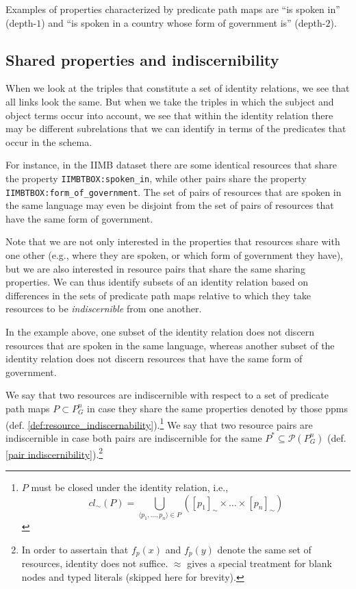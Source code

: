 \documentclass[letterpaper]{article}
\newcommand{\range}[2]{#1, \ldots, #2}
\newcommand{\tuple}[1]{\langle#1\rangle}
\begin{document}
\noindent Examples of properties characterized by predicate path maps are
  ``is spoken in'' (depth-$1$) and
  ``is spoken in a country whose form of government is'' (depth-$2$).

\subsection{Shared properties and indiscernibility}
\label{sec:indiscernibility}

When we look at the triples that constitute a set of identity relations,
  we see that all links look the same.
But when we take the triples in which the subject and object terms occur
  into account, we see that within the identity relation there may be
  different subrelations that we can identify in terms of the predicates
  that occur in the schema.

For instance, in the IIMB dataset there are some identical resources that
  share the property \verb|IIMBTBOX:spoken_in|, while other pairs share
  the property \verb|IIMBTBOX:form_of_government|.
The set of pairs of resources that are spoken in the same language may even
  be disjoint from the set of pairs of resources that have the same
  form of government.

Note that we are not only interested in the properties that resources share
  with one other (e.g., where they are spoken, or which form of government
  they have), but we are also interested in resource pairs that share
  the same sharing properties.
We can thus identify subsets of an identity relation based on differences
  in the sets of predicate path maps relative to which they take resources
  to be \emph{indiscernible} from one another.

In the example above, one subset of the identity relation does not discern
  resources that are spoken in the same language, whereas another subset
  of the identity relation does not discern resources that have the same
  form of government.

We say that two resources are indiscernible with respect to
  a set of predicate path maps $P \subset P_G^n$
  in case they share the same properties denoted by those ppms
  (def. \ref{def:resource_indiscernability}).\footnote{
    $P$ must be closed under the identity relation, i.e.,
    \begin{equation*}
      cl_{\sim}(P) = \bigcup_{\tuple{\range{p_1}{p_n}} \in P}\nolimits (
        [p_1]_{\sim} \times \ldots \times [p_n]_{\sim}
      )
    \end{equation*}}
We say that two resource pairs are indiscernible
  in case both pairs are indiscernible for the same
  $P^* \subseteq \mathcal{P}(P_G^n)$
  (def. \ref{pair indiscernibility}).\footnote{
    In order to assertain that $f_p(x)$ and $f_p(y)$ denote
      the same set of resources, identity does not suffice.
      $\approx$ gives a special treatment for blank nodes and
      typed literals (skipped here for brevity).
  }
\end{document}
